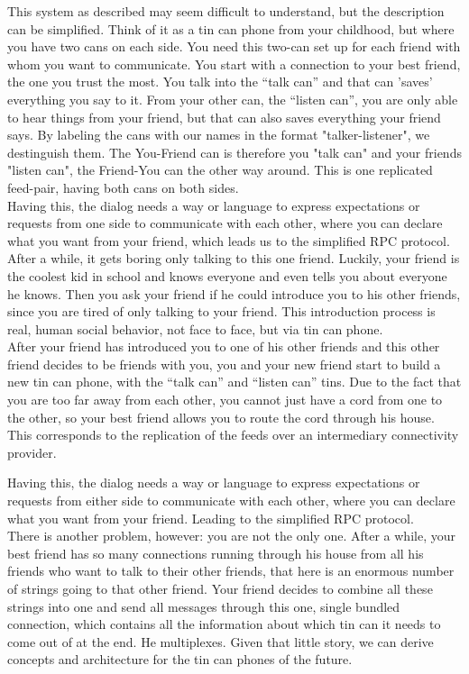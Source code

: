 This system as described may seem difficult to understand, but the description can be simplified. Think of it as a tin can phone from your childhood, but where you have two cans on each side. You need this two-can set up for each friend with whom you want to communicate. You start with a connection to your best friend, the one you trust the most. You talk into the “talk can” and that can ’saves’ everything you say to it. From your other can, the “listen can”, you are only able to hear things from your friend, but that can also saves everything your friend says. By labeling the cans with our names in the format "talker-listener", we destinguish them. The You-Friend can is therefore you "talk can" and your friends "listen can", the Friend-You can the other way around. This is one replicated feed-pair, having both cans on both sides.
\\
Having this, the dialog needs a way or language to express expectations or requests from one side to communicate with each other, where you can declare what you want from your friend, which leads us to the simplified RPC protocol. After a while, it gets boring only talking to this one friend. Luckily, your friend is the coolest kid in school and knows everyone and even tells you about everyone he knows. Then you ask your friend if he could introduce you to his other friends, since you are tired of only talking to your friend. This introduction process is real, human social behavior, not face to face, but via tin can phone.
\\
After your friend has introduced you to one of his other friends and this other friend decides to be friends with you, you and your new friend start to build a new tin can phone, with the “talk can” and “listen can” tins. Due to the fact that you are too far away from each other, you cannot just have a cord from one to the other, so your best friend allows you to route the cord through his house. This corresponds to the replication of the feeds over an intermediary connectivity provider.

Having this, the dialog needs a way or language to express expectations or requests from either side to communicate with each other, where you can declare what you want from your friend. Leading to the simplified RPC protocol.\\ 
There is another problem, however: you are not the only one. After a while, your best friend has so many connections running through his house from all his friends who want to talk to their other friends, that here is an enormous number of strings going to that other friend. Your friend decides to combine all these strings into one and send all messages through this one, single bundled connection, which contains all the information about which tin can it needs to come out of at the end. He multiplexes. Given that little story, we can derive concepts and architecture for the tin can phones of the future.

